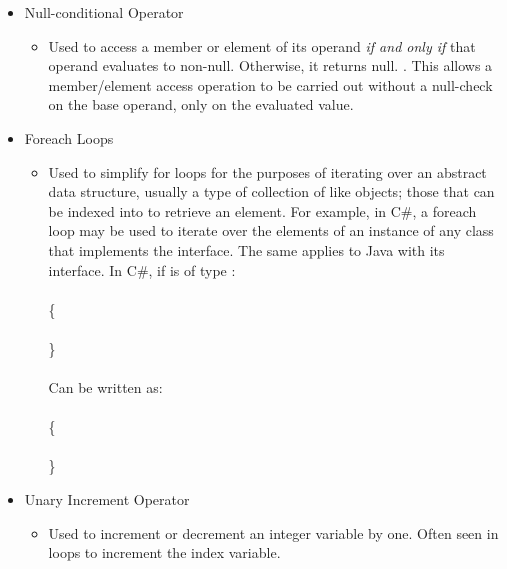 \documentclass{article}
\begin{document}
\begin{itemize}
\begin{itemize}
                \end{itemize}
            \item Null-conditional Operator
                \begin{itemize}
                    \item Used to access a member or element of its operand \emph{if and only if} that operand evaluates to non-null. Otherwise, it returns null. \citep{cs6Spec}. This allows a member/element access operation to be carried out without a null-check on the base operand, only on the evaluated value.
                \end{itemize}
             \item Foreach Loops
                \begin{itemize}
                    \item Used to simplify for loops for the purposes of iterating over an abstract data structure, usually a type of collection of like objects; those that can be indexed into to retrieve an element. For example, in C\#, a foreach loop may be used to iterate over the elements of an instance of any class that implements the  interface. The same applies to Java with its  interface. In C\#, if  is of type :
                    \\
                    \\
                    \{\\
                    \hspace*{1cm}\\
                    \}
                    \\\\
                    Can be written as:\\
                    \\
                    \{\\
                    \hspace*{1cm}\\
                    \}
                \end{itemize}
            \item Unary Increment Operator
                \begin{itemize}
                    \item Used to increment or decrement an integer variable by one. Often seen in  loops to increment the index variable.

\end{itemize}
\end{itemize}
\end{document}
